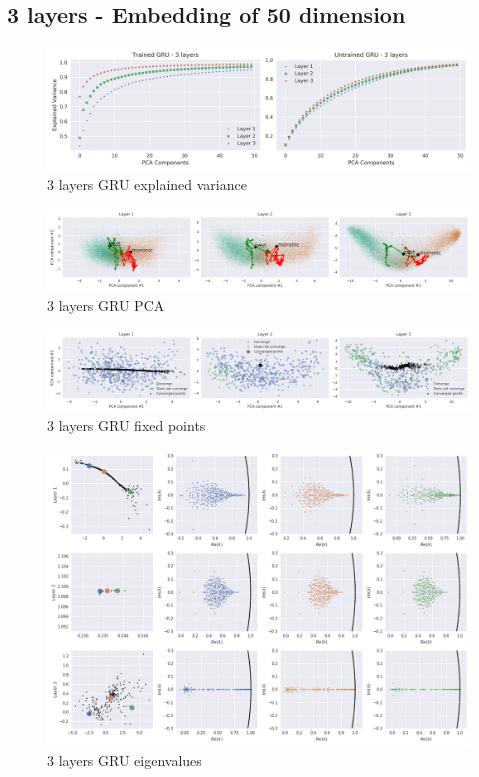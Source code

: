 \documentclass{article}
\begin{document}
\subsection{3 layers - Embedding of 50 dimension}
\label{anx:3-layers-50}
\begin{figure}[H]
  \centering
  \includegraphics[width=\textwidth]{../images/gru_3layer_50_explained_variance.png}
  \caption{3 layers GRU explained variance}
  \label{fig:-images-gru_3layer_50_explained_variance-png}
\end{figure}
\begin{figure}[H]
  \centering
  \includegraphics[width=\textwidth]{../images/gru_3layer_50_PCA.png}
  \caption{3 layers GRU PCA}
  \label{fig:-images-gru_3layer_50_PCA-png}
\end{figure}
\begin{figure}[H]
  \centering
  \includegraphics[width=\textwidth]{../images/gru_3layer_50_fixed_points.png}
  \caption{3 layers GRU fixed points}
  \label{fig:-images-gru_3layer_50_fixed_points-png}
\end{figure}
\begin{figure}[H]
  \centering
  \includegraphics[width=\textwidth]{../images/gru_3layer_50_eig.png}
  \caption{3 layers GRU eigenvalues}
  \label{fig:-images-gru_3layer_50_eig-png}
\end{figure}
\end{document}
